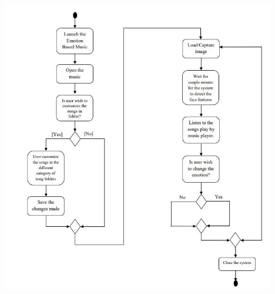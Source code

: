 \documentclass[a4paper]{article}
\begin{document}
\bigskip


\bigskip


\bigskip


\bigskip


\bigskip


\bigskip


\bigskip


\bigskip


\bigskip


\bigskip


\bigskip


\bigskip


\bigskip


\bigskip


\bigskip


\bigskip


\bigskip


\bigskip


\bigskip


\bigskip


\bigskip


\bigskip


\bigskip


\bigskip


\bigskip


\bigskip


\bigskip


\bigskip


\bigskip


\bigskip


\bigskip


\bigskip


\bigskip


\bigskip


\bigskip


 \includegraphics[width=5.4327in,height=5.0307in]{rahulop-img009.jpg} 
\end{document}
